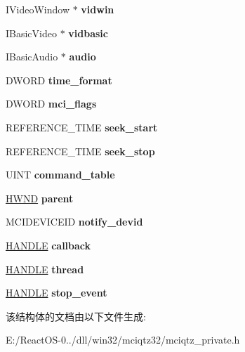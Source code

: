 \begin{DoxyCompactItemize}
I\+Video\+Window $\ast$ {\bfseries vidwin}
\item 
\mbox{\label{struct_w_i_n_e___m_c_i_q_t_z_a79653341ae82801290aeb8d6ca82b12d}} 
I\+Basic\+Video $\ast$ {\bfseries vidbasic}
\item 
\mbox{\label{struct_w_i_n_e___m_c_i_q_t_z_ad05f05f3b90fc9958103f5bf4cf79d5a}} 
I\+Basic\+Audio $\ast$ {\bfseries audio}
\item 
\mbox{\label{struct_w_i_n_e___m_c_i_q_t_z_a76107df7b285e12ddf48c8784f0118a0}} 
D\+W\+O\+RD {\bfseries time\+\_\+format}
\item 
\mbox{\label{struct_w_i_n_e___m_c_i_q_t_z_a160112621357f468a9ce6295f0842336}} 
D\+W\+O\+RD {\bfseries mci\+\_\+flags}
\item 
\mbox{\label{struct_w_i_n_e___m_c_i_q_t_z_af05d4b3024d20eda4517fdba209b2cc7}} 
R\+E\+F\+E\+R\+E\+N\+C\+E\+\_\+\+T\+I\+ME {\bfseries seek\+\_\+start}
\item 
\mbox{\label{struct_w_i_n_e___m_c_i_q_t_z_a139f1c6c526bd268b751660d27d02727}} 
R\+E\+F\+E\+R\+E\+N\+C\+E\+\_\+\+T\+I\+ME {\bfseries seek\+\_\+stop}
\item 
\mbox{\label{struct_w_i_n_e___m_c_i_q_t_z_a85d99a322b462d3255791663b89f73d5}} 
U\+I\+NT {\bfseries command\+\_\+table}
\item 
\mbox{\label{struct_w_i_n_e___m_c_i_q_t_z_aed8ea801c66d510a54707825d0133398}} 
\hyperlink{interfacevoid}{H\+W\+ND} {\bfseries parent}
\item 
\mbox{\label{struct_w_i_n_e___m_c_i_q_t_z_a8d762fa673faa3ca8f0042982936e344}} 
M\+C\+I\+D\+E\+V\+I\+C\+E\+ID {\bfseries notify\+\_\+devid}
\item 
\mbox{\label{struct_w_i_n_e___m_c_i_q_t_z_acb8d9f633ecf683aef270ca2f4370fff}} 
\hyperlink{interfacevoid}{H\+A\+N\+D\+LE} {\bfseries callback}
\item 
\mbox{\label{struct_w_i_n_e___m_c_i_q_t_z_a75a43bab31bd50c440687c62a7d4daf7}} 
\hyperlink{interfacevoid}{H\+A\+N\+D\+LE} {\bfseries thread}
\item 
\mbox{\label{struct_w_i_n_e___m_c_i_q_t_z_ab45f1b523a73bdc19738af40fe786763}} 
\hyperlink{interfacevoid}{H\+A\+N\+D\+LE} {\bfseries stop\+\_\+event}
\end{DoxyCompactItemize}


该结构体的文档由以下文件生成\+:\begin{DoxyCompactItemize}
\item 
E\+:/\+React\+O\+S-\/0../dll/win32/mciqtz32/mciqtz\+\_\+private.\+h\end{DoxyCompactItemize}
